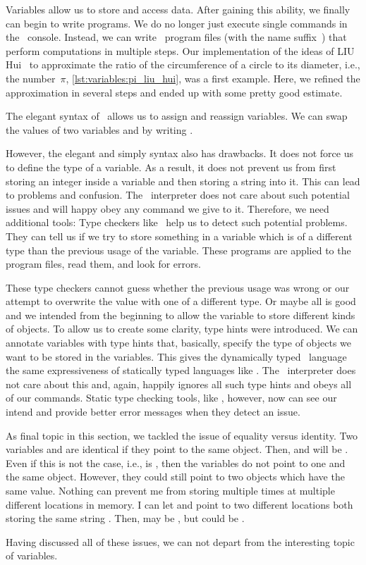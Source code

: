 %
%
Variables allow us to store and access data.
After gaining this ability, we finally can begin to write  programs.
We do no longer just execute single commands in the \python\ console.
Instead, we can write \python\ program files (with the name suffix~) that perform computations in multiple steps.
Our implementation of the ideas of LIU Hui~ to approximate the ratio of the circumference of a circle to its diameter, i.e., the number~$\pi$, \cref{lst:variables:pi_liu_hui}, was a first example.
Here, we refined the approximation in several steps and ended up with some pretty good estimate.

The elegant syntax of \python\ allows us to assign and reassign variables.
We can swap the values of two variables  and  by writing .

However, the elegant and simply syntax also has drawbacks.
It does not force us to define the type of a variable.
As a result, it does not prevent us from first storing an integer inside a variable and then storing a string into it.
This can lead to problems and confusion.
The \python\ interpreter does not care about such potential issues and will happy obey any command we give to it.
Therefore, we need additional tools:
Type checkers like \mypy\ help us to detect such potential problems.
They can tell us if we try to store something in a variable which is of a different type than the previous usage of the variable.
These programs are applied to the program files, read them, and look for errors.

These type checkers cannot guess whether the previous usage was wrong or our attempt to overwrite the value with one of a different type.
Or maybe all is good and we intended from the beginning to allow the variable to store different kinds of objects.
To allow us to create some clarity, type hints were introduced.
We can annotate variables with type hints that, basically, specify the type of objects we want to be stored in the variables.
This gives the dynamically typed \python\ language the same expressiveness of statically typed languages like .
The \python\ interpreter does not care about this and, again, happily ignores all such type hints and obeys all of our commands.
Static type checking tools, like \mypy, however, now can see our intend and provide better error messages when they detect an issue.

As final topic in this section, we tackled the issue of equality versus identity.
Two variables  and  are identical if they point to the same object.
Then,  and  will be .
Even if this is not the case, i.e.,  is , then the variables do not point to one and the same object.
However, they could still point to two objects which have the same value.
Nothing can prevent me from storing  multiple times at multiple different locations in memory.
I can let  and  point to two different locations both storing the same string .
Then,  may be , but  could be .

Having discussed all of these issues, we can not depart from the interesting topic of variables.%
%
\endhsection%
%
